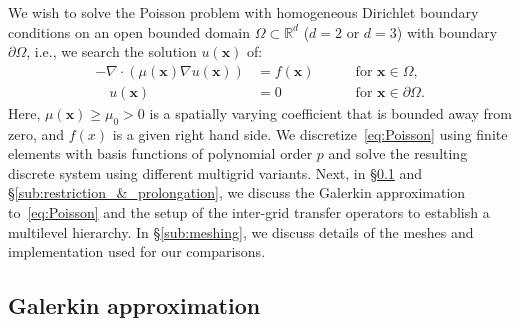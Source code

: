 \documentclass[smallcondensed,final]{svjour3}     %
\newcommand{\bs}[1]{\ensuremath{\boldsymbol #1}}
\begin{document}
We wish to solve the Poisson problem with
homogeneous Dirichlet boundary conditions on an open bounded domain
$\Omega\subset\mathbb R^d$ ($d=2$ or $d=3$) with boundary $\partial
\Omega$, i.e., we search the solution $u(\bs x)$ of:
\begin{equation}\label{eq:Poisson}
  \begin{aligned}
    -\nabla\cdot\left(\mu(\bs x)\nabla u(\bs x)\right) &= f(\bs x) \quad &&\text{ for } \bs x\in \Omega,\\
    \quad u(\bs x)& = 0  \quad &&\text{ for } \bs x\in \partial\Omega.
  \end{aligned}
\end{equation}
Here, $\mu(\bs x)\ge \mu_0>0$ is a spatially varying coefficient that
is bounded away from zero, and $f(x)$ is a given right hand side. We
discretize~\eqref{eq:Poisson} using finite elements with basis
functions of polynomial order $p$ and solve the resulting discrete
system using different multigrid variants. Next, in
\S\ref{subsec:galerkin} and \S\ref{sub:restriction_&_prolongation}, we
discuss the Galerkin approximation to~\eqref{eq:Poisson} and the setup
of the inter-grid transfer operators to establish a multilevel
hierarchy. In \S\ref{sub:meshing}, we discuss details of the meshes
and implementation used for our comparisons.

\subsection{Galerkin approximation} \label{subsec:galerkin}
\end{document}
